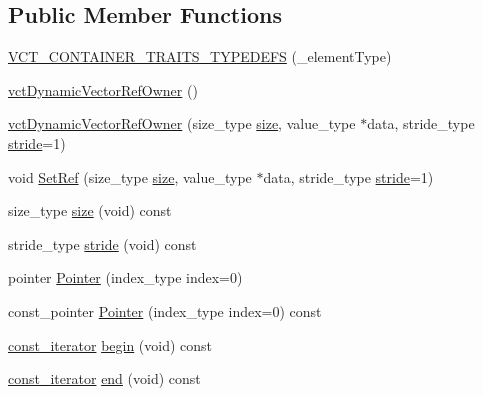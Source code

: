 \subsection*{Public Member Functions}
\begin{DoxyCompactItemize}
\item 
\hyperlink{classvct_dynamic_vector_ref_owner_a0dcf109a04e97737870516ec90241fcf}{V\-C\-T\-\_\-\-C\-O\-N\-T\-A\-I\-N\-E\-R\-\_\-\-T\-R\-A\-I\-T\-S\-\_\-\-T\-Y\-P\-E\-D\-E\-F\-S} (\-\_\-element\-Type)
\item 
\hyperlink{classvct_dynamic_vector_ref_owner_a2e1c4cccbc47183fea304b97c82d525a}{vct\-Dynamic\-Vector\-Ref\-Owner} ()
\item 
\hyperlink{classvct_dynamic_vector_ref_owner_ab23c1094dffd09bdfde6982fe855f06a}{vct\-Dynamic\-Vector\-Ref\-Owner} (size\-\_\-type \hyperlink{classvct_dynamic_vector_ref_owner_ae36ab3c8ce367ccb7cf4b0df5d0d7689}{size}, value\-\_\-type $\ast$data, stride\-\_\-type \hyperlink{classvct_dynamic_vector_ref_owner_a0d40824e0d32fe8774fec9ced242a090}{stride}=1)
\item 
void \hyperlink{classvct_dynamic_vector_ref_owner_af71e199d627c5b316f57f24b8025d3cb}{Set\-Ref} (size\-\_\-type \hyperlink{classvct_dynamic_vector_ref_owner_ae36ab3c8ce367ccb7cf4b0df5d0d7689}{size}, value\-\_\-type $\ast$data, stride\-\_\-type \hyperlink{classvct_dynamic_vector_ref_owner_a0d40824e0d32fe8774fec9ced242a090}{stride}=1)
\item 
size\-\_\-type \hyperlink{classvct_dynamic_vector_ref_owner_ae36ab3c8ce367ccb7cf4b0df5d0d7689}{size} (void) const 
\item 
stride\-\_\-type \hyperlink{classvct_dynamic_vector_ref_owner_a0d40824e0d32fe8774fec9ced242a090}{stride} (void) const 
\item 
pointer \hyperlink{classvct_dynamic_vector_ref_owner_a06f1235818043a3947c67d4d26b3d866}{Pointer} (index\-\_\-type index=0)
\item 
const\-\_\-pointer \hyperlink{classvct_dynamic_vector_ref_owner_af995ad4686900fcb5e8114bc2a05f7da}{Pointer} (index\-\_\-type index=0) const 
\item 
\hyperlink{classvct_dynamic_vector_ref_owner_a4f7a05e13925c0eeb1d5c754c3193ba0}{const\-\_\-iterator} \hyperlink{classvct_dynamic_vector_ref_owner_a9e6e7d0a1d2310ddc4402a6600f9f545}{begin} (void) const 
\item 
\hyperlink{classvct_dynamic_vector_ref_owner_a4f7a05e13925c0eeb1d5c754c3193ba0}{const\-\_\-iterator} \hyperlink{classvct_dynamic_vector_ref_owner_aebb70813d8757ad20415bb2d1a46624b}{end} (void) const 

\end{DoxyCompactItemize}
